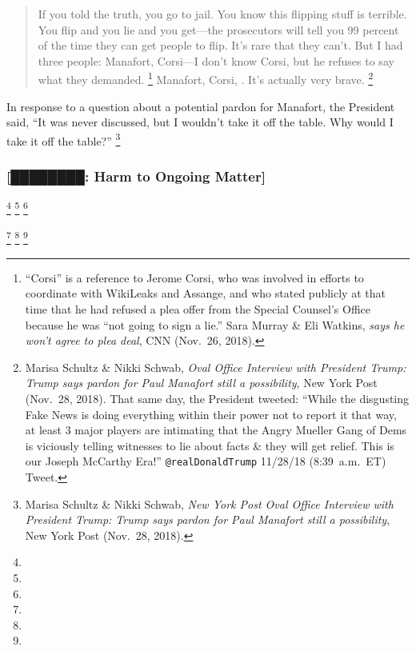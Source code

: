 \begin{quote}
If you told the truth, you go to jail.
You know this flipping stuff is terrible.
You flip and you lie and you get---the prosecutors will tell you 99 percent of the time they can get people to flip.
It's rare that they can't.
But I had three people: Manafort, Corsi---I don't know Corsi, but he refuses to say what they demanded.%
\footnote{``Corsi'' is a reference to Jerome Corsi,  who was involved in efforts to coordinate with WikiLeaks and Assange, and who stated publicly at that time that he had refused a plea offer from the Special Counsel's Office because he was ``not going to sign a lie.''
Sara Murray \& Eli Watkins,  \textit{says he won't agree to plea deal}, CNN (Nov.~26, 2018).}
Manafort, Corsi, .
It's actually very brave.%
\footnote{Marisa Schultz \& Nikki Schwab, \textit{Oval Office Interview with President Trump: Trump says pardon for Paul Manafort still a possibility}, New York Post (Nov.~28, 2018).
That same day, the President tweeted: ``While the disgusting Fake News is doing everything within their power not to report it that way, at least 3 major players are intimating that the Angry Mueller Gang of Dems is viciously telling witnesses to lie about facts \& they will get relief.
This is our Joseph McCarthy Era!'' \verb+@realDonaldTrump+ 11/28/18 (8:39~a.m.~ET) Tweet.}
\end{quote}

In response to a question about a potential pardon for Manafort, the President said, ``It was never discussed, but I wouldn't take it off the table.
Why would I take it off the table?''%
\footnote{Marisa Schultz \& Nikki Schwab, \textit{New York Post Oval Office Interview with President Trump: Trump says pardon for Paul Manafort still a possibility}, New York Post (Nov.~28, 2018).}

\subsubsection{[████████: Harm to Ongoing Matter]}

\footnote{}
\footnote{}
\footnote{}

\footnote{}
\footnote{}
\footnote{}

